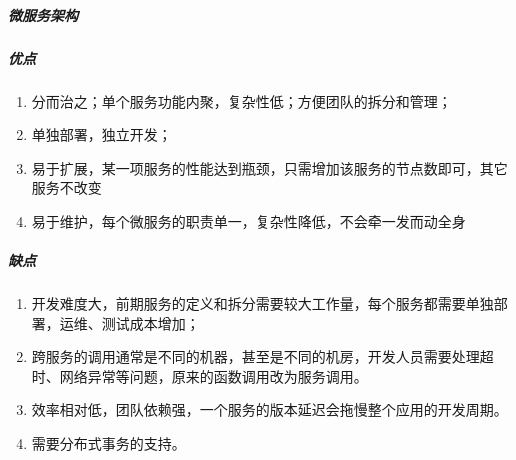 \documentclass[letterpaper,11pt,english]{sphinxmanual}
\begin{document}
\subparagraph{微服务架构}
\label{\detokenize{chapter_idea/understand_tech:id24}}\label{\detokenize{chapter_idea/understand_tech:id23}}\label{\detokenize{chapter_idea/understand_tech:id25}}

\subparagraph{优点}
\label{\detokenize{chapter_idea/understand_tech:id26}}\begin{enumerate}
%
\item {} 
分而治之；单个服务功能内聚，复杂性低；方便团队的拆分和管理；

\item {} 
单独部署，独立开发；

\item {} 
易于扩展，某一项服务的性能达到瓶颈，只需增加该服务的节点数即可，其它服务不改变

\item {} 
易于维护，每个微服务的职责单一，复杂性降低，不会牵一发而动全身

\end{enumerate}


\subparagraph{缺点}
\label{\detokenize{chapter_idea/understand_tech:id27}}\begin{enumerate}
%
\item {} 
开发难度大，前期服务的定义和拆分需要较大工作量，每个服务都需要单独部署，运维、测试成本增加；

\item {} 
跨服务的调用通常是不同的机器，甚至是不同的机房，开发人员需要处理超时、网络异常等问题，原来的函数调用改为服务调用。

\item {} 
效率相对低，团队依赖强，一个服务的版本延迟会拖慢整个应用的开发周期。

\item {} 
需要分布式事务的支持。

\end{enumerate}
\end{document}
